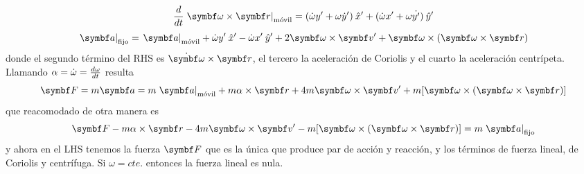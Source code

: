 \documentclass[10pt,oneside]{CBFT_book}
\begin{document}
\[
	\dtot{}{t}\left.\vb{\omega}\times\vb{r}\right|_\text{móvil} = 
	( \dot{\omega} y' + \omega \dot{y}' )\xver' + ( \dot{\omega} x' + \omega \dot{y'} )\yver'
\]
\[
	\left. \vb{a}\right|_\text{fijo} = \left. \vb{a}\right|_\text{móvil} +
	\dot{\omega}y'\xver'- \dot{\omega}x'\yver' + 2\vb{\omega}\times\vb{v'} + \vb{\omega}
	\times (\vb{\omega} \times \vb{r})
\]
donde el segundo término del RHS es $ \dot{\vb{\omega}} \times \vb{r}$, el tercero la aceleración de Coriolis y el 
cuarto la aceleración centrípeta.
Llamando $ \alpha = \dot{\omega} = \frac{d^{\hspace{-0.05em}} {\omega}}{d {t}^{\hspace{-0.05em}}}$ resulta 
\[
	\vb{F} = m\vb{a} = m \left. \vb{a}\right|_\text{móvil} + m \alpha \times \vb{r} + 4m 
	\vb{\omega}\times\vb{v'}+m[  \vb{\omega} \times (\vb{\omega}\times\vb{r} )]
\]
que reacomodado de otra manera es 
\[
	\vb{F} - m \alpha \times \vb{r} - 4m \vb{\omega}\times\vb{v'} - m[\vb{\omega} \times(\vb{\omega}\times\vb{r})]
	= m \left. \vb{a}\right|_\text{fijo}
\]
y ahora en el LHS tenemos la fuerza $\vb{F}$ que es la única que produce par de acción y reacción, y los términos de 
fuerza lineal, de Coriolis y centrífuga.
Si $\omega = cte.$ entonces la fuerza lineal es nula.



\end{document}
